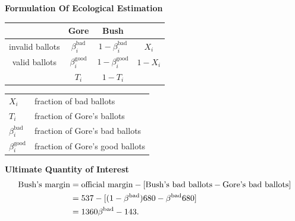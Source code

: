 \documentclass[landscape,letterpaper]{seminar}
\newcommand{\bb}{\beta^{\text{bad}}}
\newcommand{\bg}{\beta^{\text{good}}}
\begin{document}
\begin{slide}

{\bf Formulation Of Ecological Estimation}

\begin{minipage}[c]{2.75in}
\bigskip
\small
\begin{center}
\begin{tabular}{cccc}
                & Gore  & Bush &         \\
\hline 
invalid ballots & $\bb_i$  & $1-\bb_i$ & $X_i$   \\
valid ballots   & $\bg_i$  & $1-\bg_i$ & $1-X_i$ \\
\hline
                & $T_i$ & $1-T_i$ &         \\
\end{tabular} 
\end{center}
\end{minipage}
\begin{minipage}[c]{2in}
\small
\vspace{0.2in}
\begin{tabular}{l @{= } l}
$X_i$ & fraction of bad ballots \\
$T_i$ &  fraction of Gore's ballots \\
$\bb_i$ & fraction of Gore's bad ballots \\ 
$\bg_i$ & fraction of Gore's good ballots \\ 
\end{tabular}
\end{minipage}

\bigskip
\normalsize
{\bf Ultimate Quantity of Interest}
\begin{align*}
  \text{Bush's margin} & = \text{official margin}
  - [\text{Bush's bad ballots} - \text{Gore's bad ballots}] \notag\\
  & = 537 - [(1-\bb)680-\bb 680]\\
  & = 1360 \bb - 143. \label{qoi}
\end{align*}

\end{slide}

\end{document}
